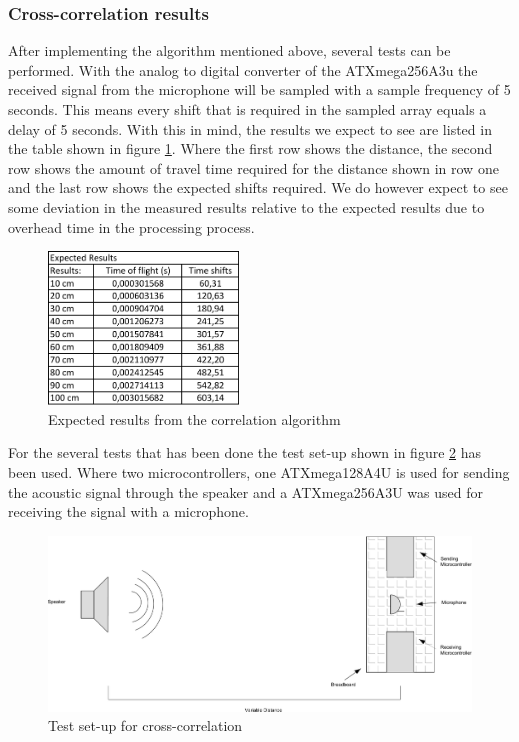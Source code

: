 \documentclass[10pt,a4paper]{article}
\begin{document}
\subsubsection{Cross-correlation results}
After implementing the algorithm mentioned above, several tests can be performed. With the analog to digital converter of the ATXmega256A3u the received signal from the microphone will be sampled with a sample frequency of 5\si{\micro} seconds. This means every shift that is required in the sampled array equals a delay of 5\si{\micro} seconds. With this in mind, the results we expect to see are listed in the table shown in figure \ref{fig:expectedresults}. Where the first row shows the distance, the second row shows the amount of travel time required for the distance shown in row one and the last row shows the expected shifts required. We do however expect to see some deviation in the measured results relative to the expected results due to overhead time in the processing process.

\begin{figure}[H]
   \centering
   \includegraphics[width=0.45\textwidth]{expectedcorrelation.pdf}
   \caption{Expected results from the correlation algorithm}
   \label{fig:expectedresults}
\end{figure}

For the several tests that has been done the test set-up shown in figure \ref{fig:testopstelling} has been used. Where two microcontrollers, one ATXmega128A4U is used for sending the acoustic signal through the speaker and a ATXmega256A3U was used for receiving the signal with a microphone.

\begin{figure}[H]
   \centering
   \includegraphics[width=\textwidth]{testopstelling.pdf}
   \caption{Test set-up for cross-correlation}
   \label{fig:testopstelling}
\end{figure}
\end{document}

